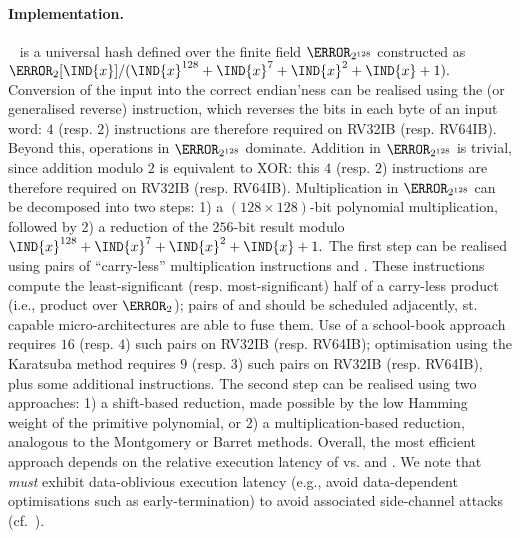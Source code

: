 
\paragraph{Implementation.}

~\cite[Section 6.4]{NIST:sp.800.38d} is a universal hash defined 
over the finite field $\F_{2^{128}}$ constructed as
$
\F_{2}[\IND{x}] / ( \IND{x}^{128} + \IND{x}^{7} + \IND{x}^{2} + \IND{x} + 1 ) .
$
Conversion of the input into the correct endian'ness can be realised using
the 
 (or generalised reverse)
instruction,
which reverses the bits in each byte of an input word:
$4$ (resp. $2$) 
instructions are therefore required on RV32IB (resp. RV64IB).
Beyond this, operations in $\F_{2^{128}}$ dominate.
Addition       in $\F_{2^{128}}$ 
is trivial, since addition modulo $2$ is equivalent to XOR: this
$4$ (resp. $2$) 
instructions are therefore required on RV32IB (resp. RV64IB).
Multiplication in $\F_{2^{128}}$ 
can be decomposed into two steps:
1) a $( 128 \times 128 )$-bit polynomial multiplication, 
   followed by 
2) a reduction of the $256$-bit result modulo
   $
   \IND{x}^{128} + \IND{x}^{7} + \IND{x}^{2} + \IND{x} + 1 .
   $
The first  step 
can be realised using pairs of ``carry-less'' multiplication instructions
 and .
These instructions compute the least-significant (resp. most-significant) 
half of a carry-less product (i.e., product over $\F_2$); pairs of 
 and 
should be scheduled adjacently, st. capable micro-architectures are able 
to fuse them.
Use of a school-book approach 
requires
$16$ (resp. $4$) such pairs 
on RV32IB (resp. RV64IB);
optimisation using the Karatsuba method
requires
$ 9$ (resp. $3$) such pairs 
on RV32IB (resp. RV64IB),
plus some additional  instructions.
The second step
can be realised using two approaches:
1) a          shift-based reduction, made possible by the low Hamming weight of the primitive polynomial,
   or
2) a multiplication-based reduction, analogous to the Montgomery or Barret methods.
Overall, the most efficient approach depends on the relative execution 
latency of
vs.
 and .
We note that 
{\em must} exhibit data-oblivious execution latency 
(e.g., avoid data-dependent optimisations such as early-termination)
to avoid associated side-channel attacks (cf.~\cite{GOPT:09}).

